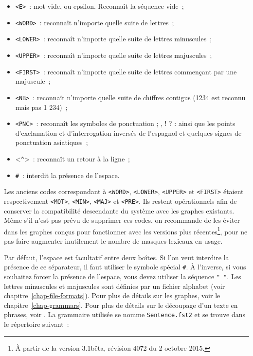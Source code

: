 \index{\verbc{<^>}}\index{\verbt{\#}}
\begin{itemize}
  \item \verb+<E>+~: mot vide, ou epsilon. Reconnaît la séquence vide~;
  \item \verb+<WORD>+~: reconnaît n’importe quelle suite de lettres~;
  \item \verb+<LOWER>+~: reconnaît n’importe quelle suite de lettres minuscules~;
  \item \verb+<UPPER>+~: reconnaît n’importe quelle suite de lettres majuscules~;
  \item \verb+<FIRST>+~: reconnaît n’importe quelle suite de lettres commençant par une majuscule~;
  \item \verb+<NB>+~: reconnaît n’importe quelle suite de chiffres contigus (1234 est reconnu mais pas 1 234)~; 
  \item \verb+<PNC>+~: reconnaît les symboles de ponctuation ; , ! ? : ainsi que les points d’exclamation
  	  et d’interrogation inversés de l’espagnol et quelques signes de ponctuation asiatiques~;
  \item <\verb+^+>~: reconnaît un retour à la ligne~;
  \item \verb+#+~: interdit la présence de l’espace.
\end{itemize}

\noindent  Les anciens codes correspondant à \verb+<WORD>+, \verb+<LOWER>+, \verb+<UPPER>+ et \verb+<FIRST>+
 étaient respectivement \verb+<MOT>+, \verb+<MIN>+, \verb+<MAJ>+ et \verb+<PRE>+.
 Ils restent opérationnels afin de conserver la compatibilité descendante
 du système avec les graphes existants. Même s'il n'est pas prévu de supprimer ces codes, on recommande de les éviter dans les graphes conçus pour fonctionner avec les versions plus récentes\footnote{À partir de la version 3.1bêta, révision 4072 du 2 octobre 2015.},
pour ne pas faire augmenter inutilement le nombre de masques lexicaux en usage.

\bigskip
\noindent Par défaut, l’espace est facultatif entre deux boîtes. Si l’on veut interdire la présence
de ce séparateur, il faut utiliser le symbole spécial \verb+#+. À l’inverse, si vous souhaitez
forcer la présence de l’espace, vous devez utiliser la séquence \verb+" "+. Les lettres minuscules
et majuscules sont définies par un fichier alphabet
(voir chapitre~\ref{chap-file-formats}). Pour plus de détails sur les graphes,
voir le chapitre~\ref{chap-grammars}. Pour plus de détails sur le découpage d’un texte en phrases,
voir \cite{ameliorer-decoupage-en-phrases}. La grammaire utilisée se nomme \verb+Sentence.fst2+ et
se trouve dans le répertoire suivant~:

